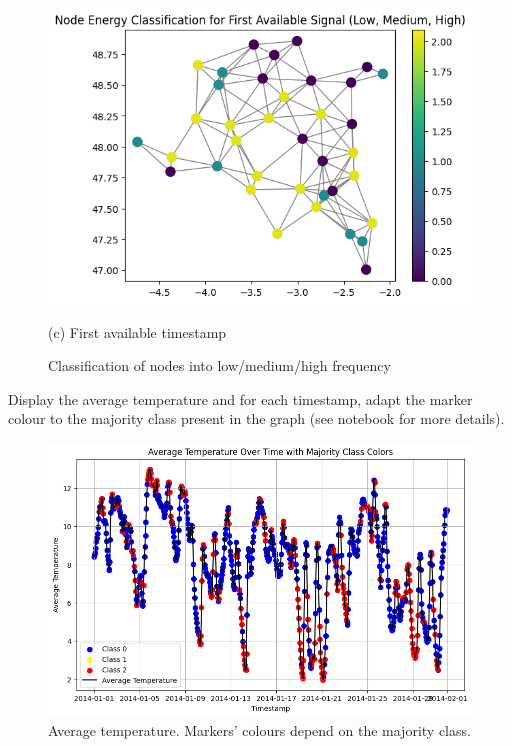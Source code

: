 \documentclass[11pt]{article}
\begin{document}
\begin{solution}
\begin{figure}
    \begin{minipage}[t]{0.45\textwidth}    \centerline{\includegraphics[width=\textwidth]{q5_c.png}}
    \centerline{(c) First available timestamp}
    \end{minipage}
    \caption{Classification of nodes into low/medium/high frequency}\label{fig:node-classif}
\end{figure}
\end{solution}

\newpage
\begin{exercise}
Display the average temperature and for each timestamp, adapt the marker colour to the majority class present in the graph (see notebook for more details).
\end{exercise}

\begin{solution}
\begin{figure}
    \centering
    \begin{minipage}[t]{0.8\textwidth}
    \centerline{\includegraphics[width=\textwidth]{q6.png}}
    \end{minipage}
    \caption{Average temperature. Markers' colours depend on the majority class.}
\end{figure}
\end{solution}
\end{document}

